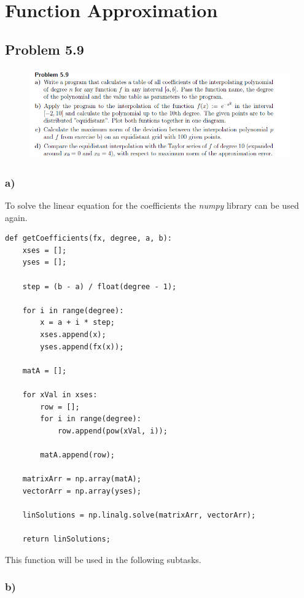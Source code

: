 \section{Function Approximation}


\subsection{Problem 5.9}


\begin{figure}[!ht]
\includegraphics[width=1\textwidth]{chapters/images/desc-5-9}
\end{figure}


\subsubsection{a)}

To solve the linear equation for the coefficients the \textit{numpy} library can be used again.

\begin{lstlisting}[caption=Problem 5.9 a)]
def getCoefficients(fx, degree, a, b):
	xses = [];
	yses = [];
	
	step = (b - a) / float(degree - 1);
	
	for i in range(degree):
		x = a + i * step;
		xses.append(x);
		yses.append(fx(x));
	
	matA = [];
	
	for xVal in xses:
		row = [];
		for i in range(degree):
			row.append(pow(xVal, i));
		
		matA.append(row);
	
	matrixArr = np.array(matA);
	vectorArr = np.array(yses);
	
	linSolutions = np.linalg.solve(matrixArr, vectorArr);
	
	return linSolutions;
\end{lstlisting}

This function will be used in the following subtasks.


\subsubsection{b)}

